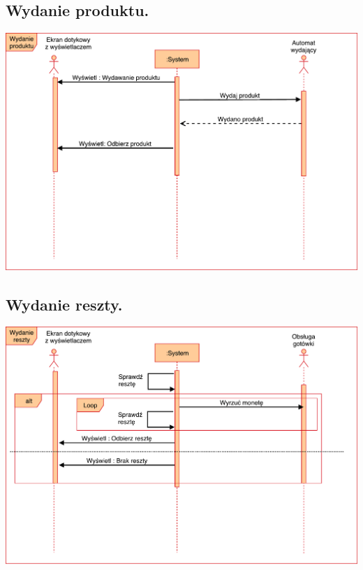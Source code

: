 \documentclass[11pt]{article}
\begin{document}
		\subsection{Wydanie produktu.}
		\begin{center}
			\includegraphics[scale=0.65]{WydanieProduktu.pdf}
		\end{center}
		\newpage
		\subsection{Wydanie reszty.}
		\begin{center}
			\includegraphics[scale=0.65]{WydanieReszty.pdf}
		\end{center}
		\newpage
\end{document}
